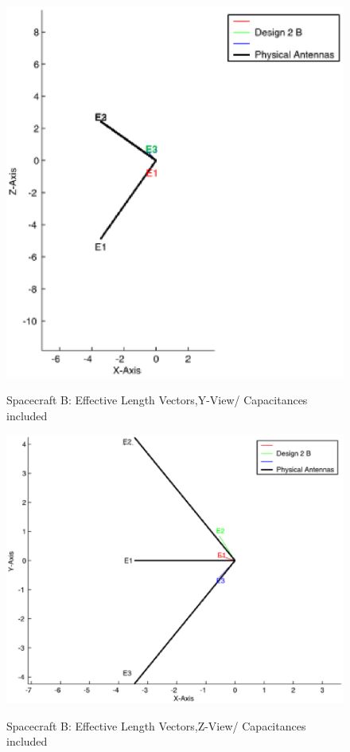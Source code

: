 \documentclass[a4paper,10pt]{thesis}
\begin{document}
\begin{figure}
 \begin{center}
 \includegraphics[width=12cm]{HeffD2HGA0-500kHz-YViewCap_B.eps}\\
    \caption{Spacecraft B: Effective Length Vectors,Y-View/ Capacitances included}\label{fig_Heff_D2_B_Y_ViewCap}\end{center}
\end{figure}

\begin{figure}
        \begin{center}
        \includegraphics[width=12cm]{HeffD2HGA0-500kHz-ZViewCap_B.eps}\\
        \caption{Spacecraft B: Effective Length Vectors,Z-View/ Capacitances included}\label{fig_Heff_D2_B_Z_ViewCap}
    \end{center}
\end{figure}
\end{document}

